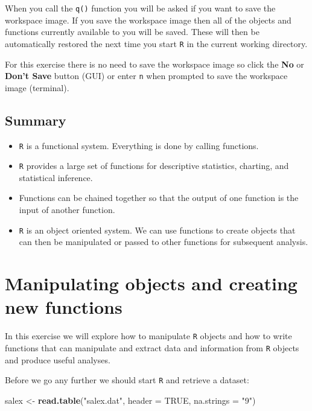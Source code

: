 \documentclass[]{book}
\newenvironment{Shaded}{\begin{snugshade}}{\end{snugshade}}
\newcommand{\KeywordTok}[1]{\textcolor[rgb]{0.13,0.29,0.53}{\textbf{#1}}}
\newcommand{\DataTypeTok}[1]{\textcolor[rgb]{0.13,0.29,0.53}{#1}}
\newcommand{\StringTok}[1]{\textcolor[rgb]{0.31,0.60,0.02}{#1}}
\newcommand{\OtherTok}[1]{\textcolor[rgb]{0.56,0.35,0.01}{#1}}
\newcommand{\NormalTok}[1]{#1}
\providecommand{\tightlist}{%
  \setlength{\itemsep}{0pt}\setlength{\parskip}{0pt}}
\theoremstyle{definition}
\theoremstyle{definition}
\theoremstyle{definition}
\theoremstyle{remark}
\begin{document}
When you call the \texttt{q()} function you will be asked if you want to
save the workspace image. If you save the workspace image then all of
the objects and functions currently available to you will be saved.
These will then be automatically restored the next time you start
\texttt{R} in the current working directory.

For this exercise there is no need to save the workspace image so click
the \textbf{No} or \textbf{Don't Save} button (GUI) or enter \texttt{n}
when prompted to save the workspace image (terminal).

\hypertarget{summary}{%
\section{Summary}\label{summary}}

\begin{itemize}
\tightlist
\item
  \texttt{R} is a functional system. Everything is done by calling
  functions.
\item
  \texttt{R} provides a large set of functions for descriptive
  statistics, charting, and statistical inference.
\item
  Functions can be chained together so that the output of one function
  is the input of another function.
\item
  \texttt{R} is an object oriented system. We can use functions to
  create objects that can then be manipulated or passed to other
  functions for subsequent analysis.
\end{itemize}

\hypertarget{exercise2}{%
\chapter{Manipulating objects and creating new
functions}\label{exercise2}}

In this exercise we will explore how to manipulate \texttt{R} objects
and how to write functions that can manipulate and extract data and
information from \texttt{R} objects and produce useful analyses.

Before we go any further we should start \texttt{R} and retrieve a
dataset:

\begin{Shaded}
\begin{Highlighting}[]
\NormalTok{salex <-}\StringTok{ }\KeywordTok{read.table}\NormalTok{(}\StringTok{"salex.dat"}\NormalTok{, }\DataTypeTok{header =} \OtherTok{TRUE}\NormalTok{, }\DataTypeTok{na.strings =} \StringTok{"9"}\NormalTok{)}
\end{Highlighting}
\end{Shaded}
\end{document}
